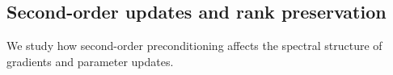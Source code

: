 \documentclass{article}
\newtheorem{theorem}{Theorem}
\newtheorem{lemma}[theorem]{Lemma}
\newtheorem{definition}{Definition}
\newcommand{\erank}{\mathrm{erank}}
\newcommand{\cL}{\mathcal{L}}
\newcommand{\cS}{\mathcal{S}}
\begin{document}








\subsection{Second-order updates and rank preservation}

We study how second-order preconditioning affects the spectral
structure of gradients and parameter updates.
\end{document}
